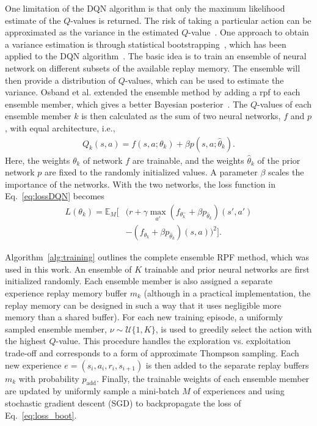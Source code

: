 One limitation of the DQN algorithm is that only the maximum likelihood estimate of the $Q$-values is returned. The risk of taking a particular action can be approximated as the variance in the estimated $Q$-value~\cite{Garcia2015}. One approach to obtain a variance estimation is through statistical bootstrapping~\cite{Efron1982}, which has been applied to the DQN algorithm~\cite{Osband2016}. The basic idea is to train an ensemble of neural network on different subsets of the available replay memory. The ensemble will then provide a distribution of $Q$-values, which can be used to estimate the variance. Osband et al. extended the ensemble method by adding a \gls{rpf} to each ensemble member, which gives a better Bayesian posterior~\cite{Osband2018}. The $Q$-values of each ensemble member $k$ is then calculated as the sum of two neural networks, $f$ and $p$, with equal architecture, i.e.,
%
\begin{align}
	Q_k(s,a) = f(s,a;\theta_k) + \beta p(s,a;\hat{\theta}_k).
\end{align}
%
Here, the weights $\theta_k$ of network $f$ are trainable, and the weights $\hat{\theta}_k$ of the prior network $p$ are fixed to the randomly initialized values. A parameter $\beta$ scales the importance of the networks. With the two networks, the loss function in Eq.~\ref{eq:lossDQN} becomes
%
\begin{align}
	\label{eq:loss_boot}
	L(\theta_k) = \mathbb{E}_M \Big[ & (r + \gamma \max_{a'} (f_{\theta^-_k}+\beta p_{\hat{\theta}_k})(s',a') \nonumber \\
	& - (f_{\theta_k}+ \beta p_{\hat{\theta}_k})(s,a) )^2 \Big].
\end{align} 

Algorithm~\ref{alg:training} outlines the complete ensemble RPF method, which was used in this work. An ensemble of $K$ trainable and prior neural networks are first initialized randomly. Each ensemble member is also assigned a separate experience replay memory buffer $m_k$ (although in a practical implementation, the replay memory can be designed in such a way that it uses negligible more memory than a shared buffer). For each new training episode, a uniformly sampled ensemble member, $\nu \sim \mathcal{U}\{1,K\}$, is used to greedily select the action with the highest $Q$-value. This procedure handles the exploration vs. exploitation trade-off and corresponds to a form of approximate Thompson sampling. Each new experience $e = (s_i, a_i, r_i, s_{i+1})$ is then added to the separate replay buffers $m_k$ with probability $p_\mathrm{add}$. Finally, the trainable weights of each ensemble member are updated by uniformly sample a mini-batch $M$ of experiences and using stochastic gradient descent (SGD) to backpropagate the loss of Eq.~\ref{eq:loss_boot}.

